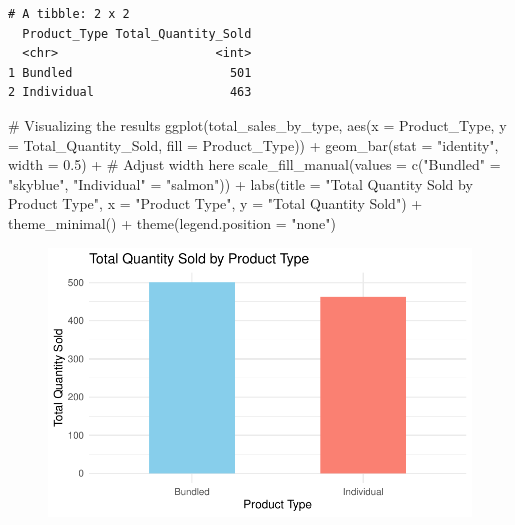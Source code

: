 \documentclass[
  letterpaper,
  DIV=11,
  numbers=noendperiod]{scrartcl}
\newenvironment{Shaded}{\begin{snugshade}}{\end{snugshade}}
\newcommand{\AttributeTok}[1]{\textcolor[rgb]{0.40,0.45,0.13}{#1}}
\newcommand{\CommentTok}[1]{\textcolor[rgb]{0.37,0.37,0.37}{#1}}
\newcommand{\FloatTok}[1]{\textcolor[rgb]{0.68,0.00,0.00}{#1}}
\newcommand{\FunctionTok}[1]{\textcolor[rgb]{0.28,0.35,0.67}{#1}}
\newcommand{\NormalTok}[1]{\textcolor[rgb]{0.00,0.23,0.31}{#1}}
\newcommand{\OtherTok}[1]{\textcolor[rgb]{0.00,0.23,0.31}{#1}}
\newcommand{\SpecialCharTok}[1]{\textcolor[rgb]{0.37,0.37,0.37}{#1}}
\newcommand{\StringTok}[1]{\textcolor[rgb]{0.13,0.47,0.30}{#1}}
\begin{document}
\begin{verbatim}
# A tibble: 2 x 2
  Product_Type Total_Quantity_Sold
  <chr>                      <int>
1 Bundled                      501
2 Individual                   463
\end{verbatim}

\begin{Shaded}
\begin{Highlighting}[]
\CommentTok{\# Visualizing the results}
\FunctionTok{ggplot}\NormalTok{(total\_sales\_by\_type, }\FunctionTok{aes}\NormalTok{(}\AttributeTok{x =}\NormalTok{ Product\_Type, }\AttributeTok{y =}\NormalTok{ Total\_Quantity\_Sold, }\AttributeTok{fill =}\NormalTok{ Product\_Type)) }\SpecialCharTok{+}
  \FunctionTok{geom\_bar}\NormalTok{(}\AttributeTok{stat =} \StringTok{"identity"}\NormalTok{, }\AttributeTok{width =} \FloatTok{0.5}\NormalTok{) }\SpecialCharTok{+}  \CommentTok{\# Adjust width here}
  \FunctionTok{scale\_fill\_manual}\NormalTok{(}\AttributeTok{values =} \FunctionTok{c}\NormalTok{(}\StringTok{"Bundled"} \OtherTok{=} \StringTok{"skyblue"}\NormalTok{, }\StringTok{"Individual"} \OtherTok{=} \StringTok{"salmon"}\NormalTok{)) }\SpecialCharTok{+}
  \FunctionTok{labs}\NormalTok{(}\AttributeTok{title =} \StringTok{"Total Quantity Sold by Product Type"}\NormalTok{,}
       \AttributeTok{x =} \StringTok{"Product Type"}\NormalTok{,}
       \AttributeTok{y =} \StringTok{"Total Quantity Sold"}\NormalTok{) }\SpecialCharTok{+}
  \FunctionTok{theme\_minimal}\NormalTok{() }\SpecialCharTok{+}
  \FunctionTok{theme}\NormalTok{(}\AttributeTok{legend.position =} \StringTok{"none"}\NormalTok{) }
\end{Highlighting}
\end{Shaded}

\begin{figure}[H]

{\centering \includegraphics{Report_files/figure-pdf/unnamed-chunk-27-1.pdf}

}

\end{figure}
\end{document}
